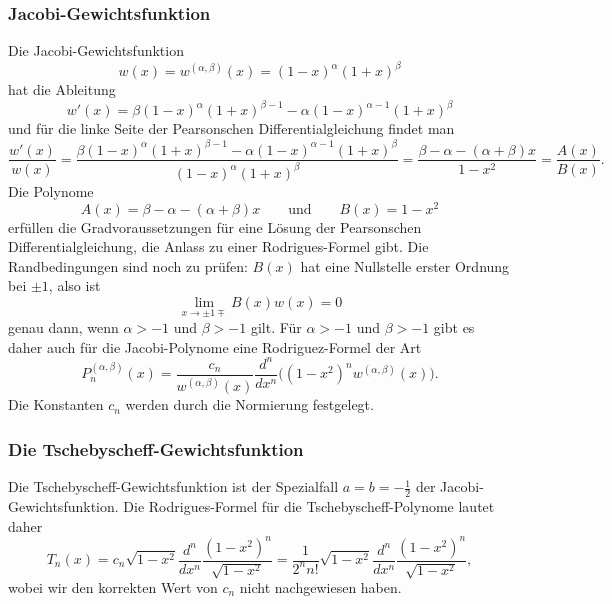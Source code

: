 \subsubsection{Jacobi-Gewichtsfunktion}
%
Die Jacobi-Gewichtsfunktion 
%
%
\[
w(x)
=
w^{(\alpha,\beta)}(x)
=
(1-x)^\alpha(1+x)^\beta
\]
hat die Ableitung
\[
w'(x)
=
\beta(1-x)^\alpha(1+x)^{\beta-1}-\alpha(1-x)^{\alpha-1}(1+x)^\beta
\]
und für die linke Seite der Pearsonschen Differentialgleichung findet man
\[
\frac{w'(x)}{w(x)}
=
\frac{
\beta(1-x)^\alpha(1+x)^{\beta-1}-\alpha(1-x)^{\alpha-1}(1+x)^\beta
}{
(1-x)^\alpha(1+x)^\beta
}
=
\frac{\beta-\alpha-(\alpha+\beta)x}{1-x^2}
=
\frac{A(x)}{B(x)}.
\]
Die Polynome
\[
A(x) = \beta-\alpha-(\alpha+\beta)x
\qquad\text{und}\qquad
B(x) = 1-x^2
\]
erfüllen die Gradvoraussetzungen für eine Lösung der Pearsonschen
Differentialgleichung, die Anlass zu einer Rodrigues-Formel gibt.
Die Randbedingungen sind noch zu prüfen: $B(x)$ hat eine Nullstelle
erster Ordnung bei $\pm1$, also ist
\[
\lim_{x\to \pm1\mp} B(x)w(x) = 0
\]
genau dann, wenn $\alpha>-1$ und $\beta>-1$ gilt.
Für $\alpha>-1$ und $\beta>-1$ gibt es daher auch für die Jacobi-Polynome
eine Rodriguez-Formel der Art
\[
P^{(\alpha,\beta)}_n(x)
=
\frac{c_n}{w^{(\alpha,\beta)}(x)}
\frac{d^n}{dx^n}
\bigl((1-x^2)^{n} w^{(\alpha,\beta)}(x)\bigr).
\]
Die Konstanten $c_n$ werden durch die Normierung
festgelegt.

%
%
\subsubsection{Die Tschebyscheff-Gewichtsfunktion}
Die Tschebyscheff-Gewichtsfunktion ist der Spezialfall $a=b=-\frac12$
der Jacobi-Gewichtsfunktion.
%
%
Die Rodrigues-Formel für die Tschebyscheff-Polynome lautet daher
\[
T_n(x)
=
c_n\sqrt{1-x^2} \frac{d^n}{dx^n}
\frac{(1-x^2)^n}{\sqrt{1-x^2}}
=
\frac{1}{2^nn!} \sqrt{1-x^2}
\frac{d^n}{dx^n} 
\frac{(1-x^2)^n}{\sqrt{1-x^2}},
\]
wobei wir den korrekten Wert von $c_n$ nicht nachgewiesen haben.

